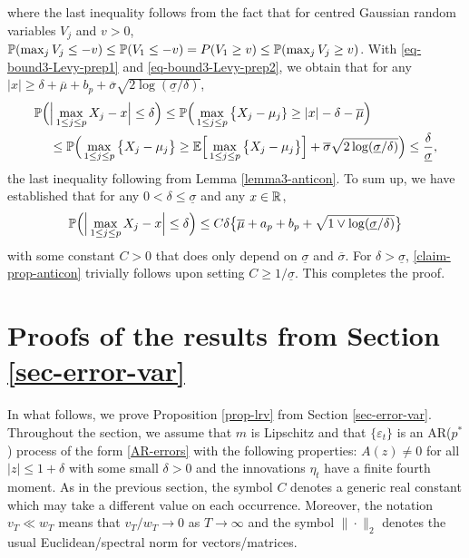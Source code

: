 where the last inequality follows from the fact that for centred Gaussian random variables $V_j$ and $v > 0$, $\mathbb{P}(\max_j V_j \le -v) \le \mathbb{P}(V_1 \le -v) = P(V_1 \ge v) \le \mathbb{P}(\max_j V_j \ge v)$. With \eqref{eq-bound3-Levy-prep1} and \eqref{eq-bound3-Levy-prep2}, we obtain that for any $|x| \ge \delta + \overline{\mu} + b_p + \overline{\sigma}\sqrt{2\log(\underline{\sigma}/\delta)}$,
\begin{align*} 
\mathbb{P} \Big( & \Big| \max_{1 \le j \le p} X_j - x \Big| \le \delta \Big) \le \mathbb{P} \Big( \max_{1 \le j \le p} \big\{ X_j - \mu_j \} \ge |x| - \delta - \overline{\mu} \Big) \\
 & \le \mathbb{P} \Big( \max_{1 \le j \le p} \big\{ X_j - \mu_j \big\} \ge \mathbb{E} \Big[ \max_{1 \le j \le p} \big\{ X_j-\mu_j \big\} \Big] + \overline{\sigma} \sqrt{2\log(\underline{\sigma}/\delta)} \Big) \le \frac{\delta}{\underline{\sigma}}, 
\end{align*}
the last inequality following from Lemma \ref{lemma3-anticon}. To sum up, we have established that for any $0 < \delta \le \underline{\sigma}$ and any $x \in \mathbb{R}$, 
\begin{equation}\label{claim-prop-anticon}
\mathbb{P} \Big( \Big| \max_{1 \le j \le p} X_j - x \Big| \le \delta \Big) \le C \delta \big\{ \overline{\mu} + a_p + b_p + \sqrt{1 \vee \log(\underline{\sigma}/\delta)} \big\} 
\end{equation}
with some constant $C > 0$ that does only depend on $\underline{\sigma}$ and $\overline{\sigma}$. For $\delta > \underline{\sigma}$, \eqref{claim-prop-anticon} trivially follows upon setting $C \ge 1/\underline{\sigma}$. This completes the proof. 



\section{Proofs of the results from Section \ref{sec-error-var}}\label{sec-supp-proofs2}


In what follows, we prove Proposition \ref{prop-lrv} from Section \ref{sec-error-var}. Throughout the section, we assume that $m$ is Lipschitz and that $\{\varepsilon_t\}$ is an AR($p^*$) process of the form \eqref{AR-errors} with the following properties: $A(z) \ne 0$ for all $|z| \le 1 + \delta$ with some small $\delta > 0$ and the innovations $\eta_t$ have a finite fourth moment. As in the previous section, the symbol $C$ denotes a generic real constant which may take a different value on each occurrence. Moreover, the notation $v_T \ll w_T$ means that $v_T/w_T \rightarrow 0$ as $T \rightarrow \infty$ and the symbol $\| \cdot \|_2$ denotes the usual Euclidean/spectral norm for vectors/matrices.



